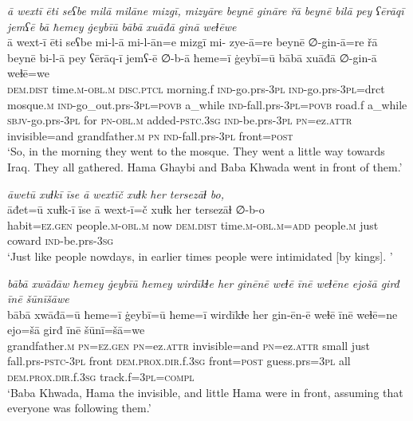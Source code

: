 \ea \label{BP.98}
\textit{ā wextī ēti seʕbe milā milāne mizgī, mizyāre beynē gināre řā beynē bilā pey ʕērāqī jemʕē bā ħemey ġeybīū bābā xuāđā ginā weɫēwe} \\ 
\gll ā wext-ī ēti seʕbe mi-l-ā mi-l-ān=e mizgī mi- zye-ā=re beynē ∅-gin-ā=re řā beynē bi-l-ā pey ʕērāq-ī jemʕ-ē ∅-b-ā ħeme=ī ġeybī=ū bābā xuāđā ∅-gin-ā weɫē=we \\ 
 \textsc{dem.dist} time\textsc{.m}\textsc{-obl}\textsc{.m} \textsc{disc.ptcl} morning.f \textsc{ind-}go.prs\textsc{-3pl} \textsc{ind-}go.prs\textsc{-3pl}=drct mosque\textsc{.m} \textsc{ind-}go\_out.prs\textsc{-3pl}\textsc{=\textsc{povb}} a\_while \textsc{ind-}fall.prs\textsc{-3pl}\textsc{=\textsc{povb}} road.f a\_while \textsc{sbjv-}go.prs\textsc{-3pl} for \textsc{pn}\textsc{-obl}\textsc{.m} added\textsc{-pstc}\textsc{.3sg} \textsc{ind-}be.prs\textsc{-3pl} \textsc{pn}=ez.\textsc{attr} invisible=and grandfather\textsc{.m} \textsc{pn} \textsc{ind-}fall.prs\textsc{-3pl} front\textsc{=\textsc{post}} \\ 
\glt `So, in the morning they went to the mosque. They went a little way towards Iraq. They all gathered. Hama Ghaybi and Baba Khwada went in front of them.'
\z 
 
\ea \label{BP.100}
\textit{āwetū xuɫkī īse ā wextīč xuɫk her tersezāɫ bo,} \\ 
\gll āđet=ū xuɫk-ī īse ā wext-ī=č xuɫk her tersezāɫ ∅-b-o \\ 
 habit\textsc{=ez.gen} people\textsc{.m}\textsc{-obl}\textsc{.m} now \textsc{dem.dist} time\textsc{.m}\textsc{-obl}\textsc{.m}\textsc{=add} people\textsc{.m} just coward \textsc{ind-}be.prs\textsc{-3sg} \\ 
\glt `Just like people nowdays, in earlier times people were intimidated [by kings]. '
\z 
 
\ea \label{BP.105}
\textit{bābā xwāđāw ħemey ġeybīū ħemey wirdīkɫe her ginēnē weɫē īnē weɫēne ejošā girđ īnē šūnīšāwe} \\ 
\gll bābā xwāđā=ū ħeme=ī ġeybī=ū ħeme=ī wirdīkɫe her gin-ēn-ē weɫē īnē weɫē=ne ejo=šā girđ īnē šūnī=šā=we \\ 
 grandfather\textsc{.m} \textsc{pn}\textsc{=ez.gen} \textsc{pn}=ez.\textsc{attr} invisible=and \textsc{pn}=ez.\textsc{attr} small just fall.prs\textsc{-pstc}\textsc{-3pl} front \textsc{dem.prox}\textsc{.dir}.f\textsc{.3sg} front\textsc{=\textsc{post}} guess.prs\textsc{=3pl} all \textsc{dem.prox}\textsc{.dir}.f\textsc{.3sg} track.f\textsc{=3pl}\textsc{=compl} \\ 
\glt `Baba Khwada, Hama the invisible, and little Hama were in front, assuming that everyone was following them.'
\z 
 
